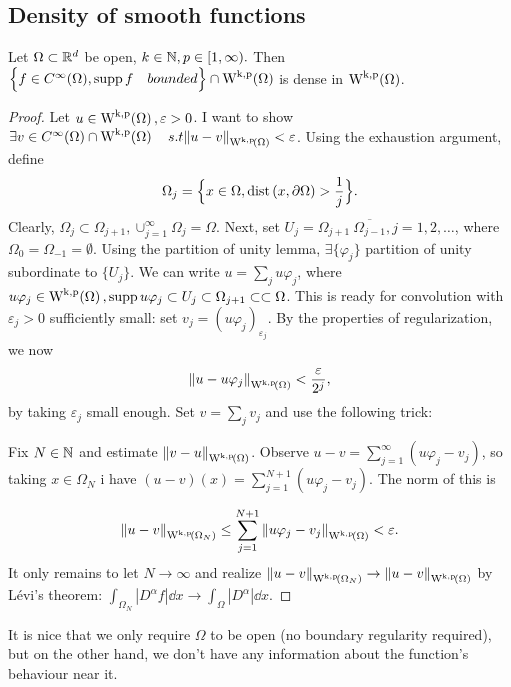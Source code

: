 \documentclass{article}
\begin{document}
\subsection{Density of smooth functions}
\label{sec:density}

\begin{theorem}
	Let $\Omega \subset {\mathbb R}^d$ be open, $k \in {\mathbb N}, p \in [1,\infty).$ Then $\Big\{ f \in C^\infty(\Omega), \supp f \quad{bounded}\Big\} \cap \WkpSet{\Omega}$ is dense in $\WkpSet{\Omega}$.
\end{theorem}
\begin{proof}
	Let $u \in \WkpSet{\Omega}, \varepsilon >0$. I want to show $\exists v \in C^\infty(\Omega) \cap \WkpSet{\Omega} \quad{s.t} \norm{u-v}_{\WkpSet{\Omega}} < \varepsilon$.
	Using the exhaustion argument, define
	\[
		\Omega_j = \Big\{ x \in \Omega, \operatorname{dist}\qty(x,\partial \Omega) > \frac{1}{j}\Big\}.
	\]
	Clearly, $\Omega_j \subset \Omega_{j+1}, \cup_{j=1}^\infty \Omega_j =\Omega$. Next, set $U_j = \Omega_{j+1} \ \overline{\Omega_{j-1}}, j=1,2, \dots$, where $\Omega_0 = \Omega_{-1} = \emptyset$. Using the partition of unity lemma, $\exists \{\varphi_j\} $ partition of unity subordinate to $\{U_j\}$. We can write $u = \sum_j u \varphi_j$, where $u \varphi_j \in \WkpSet{\Omega}, \supp u \varphi_j \subset U_j \subset \Omega_{j+1} \subset \subset \Omega$. This is ready for convolution with $\varepsilon_j >0$ sufficiently small: set $ v_j = (u \varphi_j)_{\varepsilon_j}$. By the properties of regularization, we now
	\[
		\norm{u - u \varphi_j }_{\WkpSet{\Omega}} < \frac{\varepsilon}{2^j},
	\]
by taking $\varepsilon_j$ small enough. Set $v = \sum_j v_j$ and use the following trick:

Fix $N \in {\mathbb N}$ and estimate $\norm{v-u}_{\WkpSet{\Omega}}$. Observe $u-v = \sum_{j=1}^\infty(u \varphi_j - v_j)$, so taking $x \in \Omega_N$ i have $(u-v)(x) = \sum_{j=1}^{N+1}(u \varphi_j - v_j)$. The norm of this is

\begin{equation*}
    \norm{u-v}_{\WkpSet{\Omega_N}} \leq \sum_{j=1}^{N+1}\norm{u \varphi_j - v_j}_{\WkpSet{\Omega}} < \varepsilon.
\end{equation*}
It only remains to let $N \to \infty$ and realize $\norm{u-v}_{\WkpSet{\Omega_N}} \to \norm{u-v}_{\WkpSet{\Omega}}$ by Lévi's theorem: $\int_{\Omega_N}|D^\alpha f|\dd{x} \to \int_{\Omega}|D^\alpha|\dd{x}$. 
\end{proof}

\begin{remark}
    It is nice that we only require $\Omega$ to be open (no boundary regularity required), but on the other hand, we don't have any information about the function's behaviour near it.
\end{remark}
\end{document}
